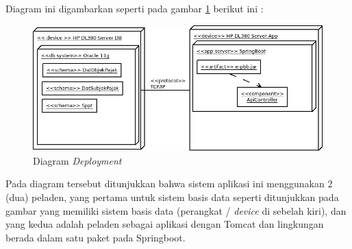 Diagram ini digambarkan seperti pada gambar \ref{fig:deploy-dia} berikut ini :

\begin{figure}[H]
	\centering
	\includegraphics[width=1\textwidth]{./resources/uml/deploy-diagram}
	\caption{Diagram \textit{Deployment}}
	\label{fig:deploy-dia}
\end{figure}

Pada diagram tersebut ditunjukkan bahwa sistem aplikasi ini menggunakan 2 (dua) peladen, yang pertama untuk sistem basis data seperti ditunjukkan pada gambar yang memiliki sistem basis data (perangkat / \textit{device} di sebelah kiri), dan yang kedua adalah peladen sebagai aplikasi dengan Tomcat dan lingkungan berada dalam satu paket pada Springboot.

